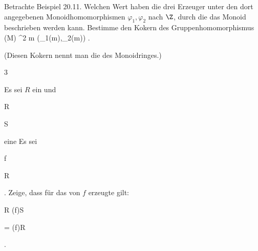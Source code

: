 
{} {}



{}

{


Betrachte
Beispiel 20.11.
Welchen Wert haben die drei Erzeuger unter den dort angegebenen Monoidhomomorphismen $\varphi_1,\varphi_2$ nach $\Z$, durch die das Monoid beschrieben werden kann. Bestimme den Kokern des Gruppenhomomorphismus
\maabbeledisp {} {\Gamma(M)  } { \Z^2
} { m } { (\varphi_1(m),\varphi_2(m))
} {.}


}

{(Diesen Kokern nennt man die  {} des Monoidringes.)} {}





{3}

{


Es sei $R$ ein
und


\mavergleichskette

{\vergleichskette

{ R
}

{ \subseteq }{ S
}

{  }{
}

{    }{
}

{   }{
}

}
{}{}{}
eine
Es sei


\mavergleichskette

{\vergleichskette

{f
}

{ \in }{ R
}

{  }{
}

{    }{
}

{   }{
}

}
{}{}{.}
Zeige, dass für das von $f$ erzeugte
gilt:


\mavergleichskettedisp

{\vergleichskette

{ R \cap (f)S
}

{ =} { (f)R
}

{ } {
}

{ } {
}

{ } {
}

}
{}{}{.}


}

{} {}



